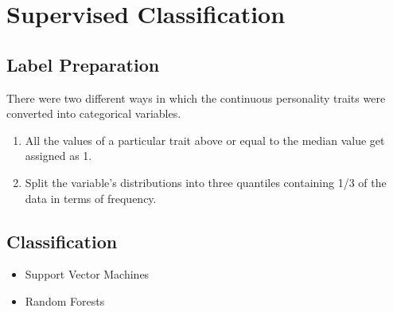 \documentclass[msthesis.tex]{subfiles}
\begin{document}
\section{Supervised Classification}

\subsection{Label Preparation}
\label{sec:label_preparation}
There were two different ways in which the continuous personality traits were converted into categorical variables. 
\begin{enumerate}
    \item All the values of a particular trait above or equal to the median value get assigned as 1. 
    \item Split the variable's distributions into three quantiles containing 1/3 of the data in terms of frequency. 
\end{enumerate}

\subsection{Classification}
\begin{itemize}
    \item Support Vector Machines
    \item Random Forests

\end{itemize}
\end{document}
